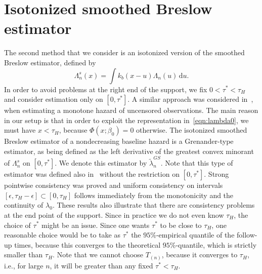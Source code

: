 \documentclass[11pt,reqno]{amsart}
\theoremstyle{definition}
\theoremstyle{plain}
\theoremstyle{remark}
\begin{document}
\section{Isotonized smoothed Breslow estimator}
\label{sec:GS}

The second method that we consider is an isotonized version of the smoothed Breslow estimator, defined by
\begin{equation}
\label{def:smoothed Breslow}
\Lambda_n^s(x)
=
\int k_b(x-u)\Lambda_n(u)\,\mathrm{d}u.
\end{equation}
In order to avoid problems at the right end of the support, we fix $0<\tau^*<\tau_H$ and consider estimation only on $[0,\tau^*]$.
A similar approach was considered in~\cite{GJ13}, when estimating a monotone hazard of uncensored observations.
The main reason in our setup is that in order to exploit the representation in~\eqref{eqn:lambda0},
we must have $x<\tau_H$, because $\Phi(x;\beta_0)=0$ otherwise.
The isotonized smoothed Breslow estimator of a nondecreasing baseline hazard is a Grenander-type estimator,
as being defined as the left derivative of the greatest convex minorant of $\Lambda_n^s$ on $[0,\tau^*]$.
We denote this estimator by $\tilde{\lambda}_n^{GS}$.
Note that this type of estimator was defined also in~\cite{Nane} without the restriction on $[0,\tau^*]$.
Strong pointwise consistency was proved  and uniform consistency on intervals $[\epsilon, \tau_H-\epsilon]\subset[0,\tau_H]$ follows immediately from the monotonicity and the continuity of $\lambda_0$.
These results also illustrate that there are consistency problems at the end point of the support.
Since in practice we do not even know $\tau_H$, the choice of $\tau^*$ might be an issue.
Since one wants $\tau^*$ to be close to $\tau_H$, one reasonable choice would be to take as $\tau^*$ the $95\%$-empirical quantile of the follow-up times, because this converges to the theoretical $95\%$-quantile,
which is strictly smaller than $\tau_H$.
Note that we cannot choose $T_{(n)}$, because it converges to $\tau_H$,
i.e., for large $n$, it will be greater than any fixed $\tau^*<\tau_H$.
\end{document}

